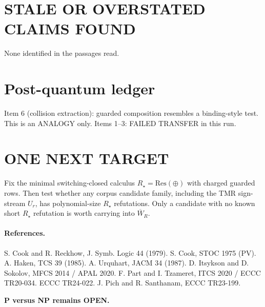 \documentclass[11pt]{article}
\begin{document}
\section{STALE OR OVERSTATED CLAIMS FOUND}
None identified in the passages read.

\section{Post-quantum ledger}
Item 6 (collision extraction): guarded composition resembles a binding-style test. This is an ANALOGY only. Items 1--3: FAILED TRANSFER in this run.

\section{ONE NEXT TARGET}
Fix the minimal switching-closed calculus $R_\star=\mathrm{Res}(\oplus)$ with charged guarded rows. Then test whether any corpus candidate family, including the TMR sign-stream $U_r$, has polynomial-size $R_\star$ refutations. Only a candidate with no known short $R_\star$ refutation is worth carrying into $\overline W_R$.

\paragraph{References.} S. Cook and R. Reckhow, J. Symb. Logic 44 (1979). S. Cook, STOC 1975 (PV). A. Haken, TCS 39 (1985). A. Urquhart, JACM 34 (1987). D. Itsykson and D. Sokolov, MFCS 2014 / APAL 2020. F. Part and I. Tzameret, ITCS 2020 / ECCC TR20-034. ECCC TR24-022. J. Pich and R. Santhanam, ECCC TR23-199.

\textbf{P versus NP remains OPEN.}
\end{document}

